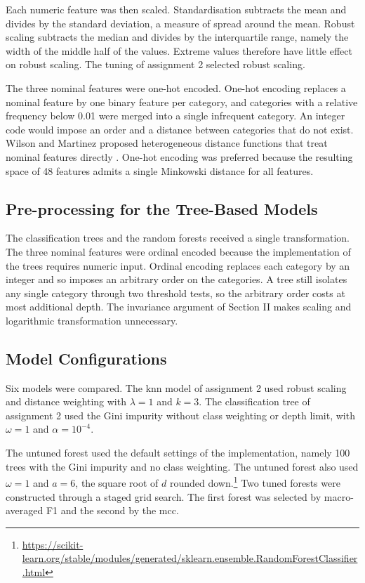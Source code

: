 \documentclass[conference]{IEEEtran}
\begin{document}
Each numeric feature was then scaled. Standardisation subtracts the mean and
divides by the standard deviation, a measure of spread around the mean. Robust
scaling subtracts the median and divides by the interquartile range, namely the
width of the middle half of the values. Extreme values therefore have little effect
on robust scaling. The tuning of assignment 2 selected robust scaling.

The three nominal features were one-hot encoded. One-hot encoding replaces a
nominal feature by one binary feature per category, and categories with a relative
frequency below 0.01 were merged into a single infrequent category. An integer code
would impose an order and a distance between categories that do not exist. Wilson
and Martinez proposed heterogeneous distance functions that treat nominal features
directly \cite{wilson1997}. One-hot encoding was preferred because the resulting
space of 48 features admits a single Minkowski distance for all features.

\subsection{Pre-processing for the Tree-Based Models}

The classification trees and the random forests received a single transformation.
The three nominal features were ordinal encoded because the implementation of the
trees requires numeric input. Ordinal encoding replaces each category by an
integer and so imposes an arbitrary order on the categories. A tree still isolates
any single category through two threshold tests, so the arbitrary order costs at
most additional depth. The invariance argument of Section II makes scaling and
logarithmic transformation unnecessary.

\subsection{Model Configurations}

Six models were compared. The \gls{knn} model of assignment 2 used robust scaling
and distance weighting with $\lambda = 1$ and $k = 3$. The classification tree of
assignment 2 used the Gini impurity without class weighting or depth limit, with
$\omega = 1$ and $\alpha = 10^{-4}$.

The untuned forest used the default settings of the implementation, namely 100
trees with the Gini impurity and no class weighting. The untuned forest also used
$\omega = 1$ and $a = 6$, the square root of $d$ rounded
down.\footnote{\url{https://scikit-learn.org/stable/modules/generated/sklearn.ensemble.RandomForestClassifier.html}}
Two tuned forests were constructed through a staged grid search. The first forest
was selected by macro-averaged F1 and the second by the \gls{mcc}.
\end{document}

